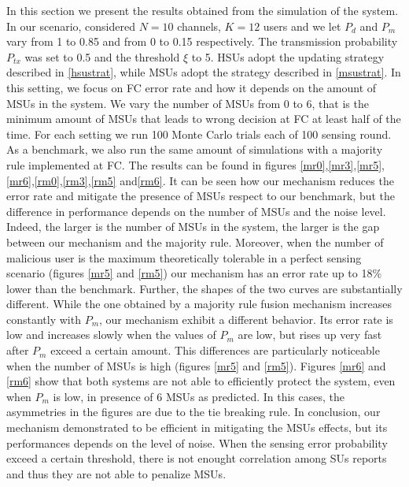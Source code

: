 \documentclass[letterpaper, 10 pt, conference]{ieeeconf}  %
\begin{document}
In this section we present the results obtained from the simulation of the system. In our scenario, considered $N=10$ channels, $K=12$ users and we let $P_d$ and $P_m$ vary from 1 to 0.85 and from 0 to 0.15 respectively. The transmission probability $P_{tx}$ was set to 0.5 and the threshold $\xi$ to 5. HSUs adopt the updating strategy described in \ref{hsustrat}, while MSUs adopt the strategy described in \ref{msustrat}. In this setting, we focus on FC error rate and how it depends on the amount of MSUs in the system. We vary the number of MSUs from 0 to 6, that is the minimum amount of MSUs that leads to wrong decision at FC at least half of the time. For each setting we run 100 Monte Carlo trials each of 100 sensing round. As a benchmark, we also run the same amount of simulations with a majority rule implemented at FC. The results can be found in figures \ref{mr0},\ref{mr3},\ref{mr5},\ref{mr6},\ref{rm0},\ref{rm3},\ref{rm5} and\ref{rm6}. It can be seen how our mechanism reduces the error rate and mitigate the presence of MSUs respect to our benchmark, but the difference in performance depends on the number of MSUs and the noise level. Indeed, the larger is the number of MSUs in the system, the larger is the gap between our mechanism and the majority rule. Moreover, when the number of malicious user is the maximum theoretically tolerable in a perfect sensing scenario (figures \ref{mr5} and \ref{rm5}) our mechanism has an error rate up to 18\% lower than the benchmark. Further, the shapes of the two curves are substantially different. While the one obtained by a majority rule fusion mechanism increases constantly with $P_m$, our mechanism exhibit a different behavior. Its error rate is low and increases slowly when the values of $P_m$ are low, but rises up very fast after $P_m$ exceed a certain amount. This differences are particularly noticeable when the number of MSUs is high (figures \ref{mr5} and \ref{rm5}). Figures \ref{mr6} and \ref{rm6} show that both systems are not able to efficiently protect the system, even when $P_m$ is low, in presence of 6 MSUs as predicted. In this cases, the asymmetries in the figures are due to the tie breaking rule. In conclusion, our mechanism demonstrated to be efficient in mitigating the MSUs effects, but its performances depends on the level of noise. When the sensing error probability exceed a certain threshold, there is not enought correlation among SUs reports and thus they are not able to penalize MSUs. 
\end{document}
